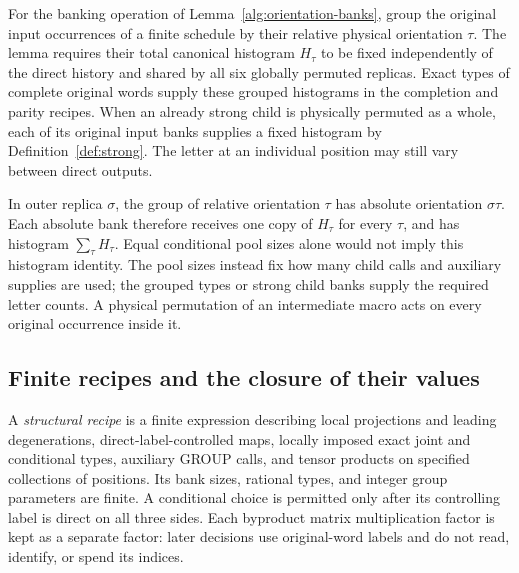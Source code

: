 \documentclass[11pt]{article}
\numberwithin{equation}{section}
\theoremstyle{definition}
\theoremstyle{remark}
\begin{document}
For the banking operation of Lemma~\ref{alg:orientation-banks}, group the
original input occurrences of a finite schedule by their relative physical
orientation $\tau$.  The lemma requires their total canonical histogram
$H_\tau$ to be fixed independently of the direct history and shared by all
six globally permuted replicas.  Exact types of complete original words
supply these grouped histograms in the completion and parity recipes.
When an already strong child is physically permuted as a whole, each of
its original input banks supplies a fixed histogram by
Definition~\ref{def:strong}.  The letter at an individual position may
still vary between direct outputs.

In outer replica $\sigma$, the group of relative orientation $\tau$ has
absolute orientation $\sigma\tau$.  Each absolute bank therefore receives
one copy of $H_\tau$ for every $\tau$, and has histogram
$\sum_\tau H_\tau$.  Equal conditional pool sizes alone would not imply
this histogram identity.  The pool sizes instead fix how many child calls
and auxiliary supplies are used; the grouped types or strong child banks
supply the required letter counts.  A physical permutation of an
intermediate macro acts on every original occurrence inside it.

\subsection{Finite recipes and the closure of their values}
\label{val:recipes}

A \emph{structural recipe} is a finite expression describing local
projections and leading degenerations, direct-label-controlled maps, locally
imposed exact joint and conditional types, auxiliary GROUP calls, and tensor
products on specified collections of positions.  Its bank sizes, rational types, and
integer group parameters are finite.  A conditional choice is permitted only
after its controlling label is direct on all three sides.  Each byproduct
matrix multiplication factor is kept as a separate factor: later decisions
use original-word labels and do not read, identify, or spend its indices.
\end{document}
